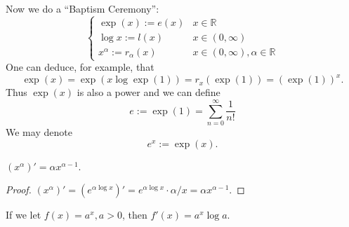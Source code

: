 Now we do a ``Baptism Ceremony'':
\[
    \begin{cases}
    \exp (x):=e(x) &x\in \mathbb{R} \\
    \log x :=l(x) &x\in (0,\infty )\\
    x^{\alpha}:= r_\alpha(x) & x\in (0,\infty ),\alpha\in \mathbb{R}
    \end{cases} 
\]
One can deduce, for example, that 
\[
    \exp (x)=\exp (x \log \exp (1) ) = r_x(\exp (1)) = (\exp (1))^x.
\]
Thus $\exp(x)$ is also a power and we can define 
\[
    \boxed{e:= \exp (1) = \sum_{n=0}^{\infty}\frac{1}{n!}}
\]
We may denote 
\[
    e^x:= \exp (x).
\]
\begin{sprop}
    $ (x^\alpha)'=\alpha x^{\alpha-1} $.
\end{sprop}
\begin{proof}
    $ (x^\alpha)'=(e^{\alpha \log x})'=e^{\alpha \log x}\cdot \alpha/x = \alpha x^{\alpha-1} $.
\end{proof}
\begin{note}
    If we let $ f(x)=a^x,a>0 $, then $ f'(x)=a^x\log a $.
\end{note}